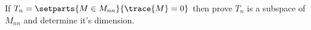 If $T_{n}=\setparts{M \in M_{nn}}{\trace{M}=0}$ then prove $T_{n}$ is a subspace of $M_{nn}$ and determine it's dimension.